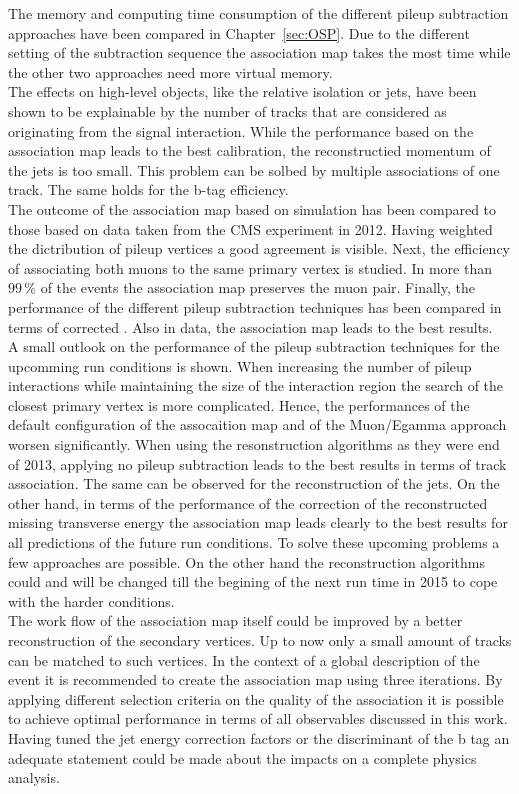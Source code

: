 The memory and computing time consumption of the different pileup subtraction approaches have been compared in Chapter~\ref{sec:OSP}. Due to the different setting of the subtraction sequence the association map takes the most time while the other two approaches need more virtual memory. \\
The effects on high-level objects, like the relative isolation or jets, have been shown to be explainable by the number of tracks that are considered as originating from the signal interaction. While the performance based on the association map leads to the best \MET{} calibration, the reconstructied momentum of the jets is too small. This problem can be solbed by multiple associations of one track. The same holds for the b-tag efficiency. \\
The outcome of the association map based on simulation has been compared to those based on data taken from the CMS experiment in 2012. Having weighted the dictribution of pileup vertices a good agreement is visible. Next, the efficiency of associating both muons to the same primary vertex is studied. In more than $99\,\%$ of the events the association map preserves the muon pair. Finally, the performance of the different pileup subtraction techniques has been compared in terms of corrected \MET{}. Also in data, the association map leads to the best results. \\
A small outlook on the performance of the pileup subtraction techniques for the upcomming run conditions is shown. When increasing the number of pileup interactions while maintaining the size of the interaction region the search of the closest primary vertex is more complicated. Hence, the performances of the default configuration of the assocaition map and of the Muon/Egamma approach worsen significantly. When using the resonstruction algorithms as they were end of 2013, applying no pileup subtraction leads to the best results in terms of track association. The same can be observed for the reconstruction of the jets. On the other hand, in terms of the performance of the correction of the reconstructed missing transverse energy the association map leads clearly to the best results for all predictions of the future run conditions. To solve these upcoming problems a few approaches are possible. On the other hand the reconstruction algorithms could and will be changed till the begining of the next run time in 2015 to cope with the harder conditions. \\
The work flow of the association map itself could be improved by a better reconstruction of the secondary vertices. Up to now only a small amount of tracks can be matched to such vertices. In the context of a global description of the event it is recommended to create the association map using three iterations. By applying different selection criteria on the quality of the association it is possible to achieve optimal performance in terms of all observables discussed in this work. Having tuned the jet energy correction factors or the discriminant of the b tag an adequate statement could be made about the impacts on a complete physics analysis.
